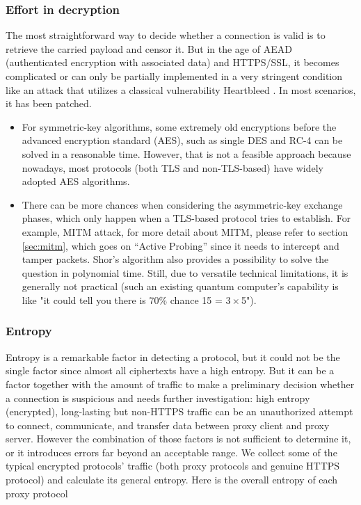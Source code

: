 \documentclass[conference]{IEEEtran}
\begin{document}
\subsubsection{Effort in decryption}
 The most straightforward way to decide whether a connection is valid is to retrieve the carried payload and censor it. But in the age of AEAD (authenticated encryption with associated data) and HTTPS/SSL, it becomes complicated or can only be partially implemented in a very stringent condition like an attack that utilizes a classical vulnerability Heartbleed \cite{Heartbleed}. In most scenarios, it has been patched. 
 \begin{itemize}
    \item  For symmetric-key algorithms, some extremely old encryptions before the advanced encryption standard (AES), such as single DES and RC-4 can be solved in a reasonable time. However, that is not a feasible approach because nowadays, most protocols (both TLS and non-TLS-based) have widely adopted AES algorithms.
    \item There can be more chances when considering the asymmetric-key exchange phases, which only happen when a TLS-based protocol tries to establish. For example, MITM attack, for more detail about MITM, please refer to section \ref{sec:mitm}, which goes on “Active Probing” since it needs to intercept and tamper packets. Shor’s algorithm \cite{Shors_Algorithm} also provides a possibility to solve the question in polynomial time. Still, due to versatile technical limitations, it is generally not practical (such an existing quantum computer’s capability is like "it could tell you there is 70\% chance 15 = $3\times$5").
 \end{itemize}


\subsubsection{Entropy}
Entropy is a remarkable factor in detecting a protocol, but it could not be the single factor since almost all ciphertexts have a high entropy. But it can be a factor together with the amount of traffic to make a preliminary decision whether a connection is suspicious and needs further investigation: high entropy (encrypted), long-lasting but non-HTTPS traffic can be an unauthorized attempt to connect, communicate, and transfer data between proxy client and proxy server. However the combination of those factors is not sufficient to determine it, or it introduces errors far beyond an acceptable range. 
We collect some of the typical encrypted protocols' traffic (both proxy protocols and genuine HTTPS protocol) and calculate its general entropy.
Here is the overall entropy of each proxy protocol
\end{document}
